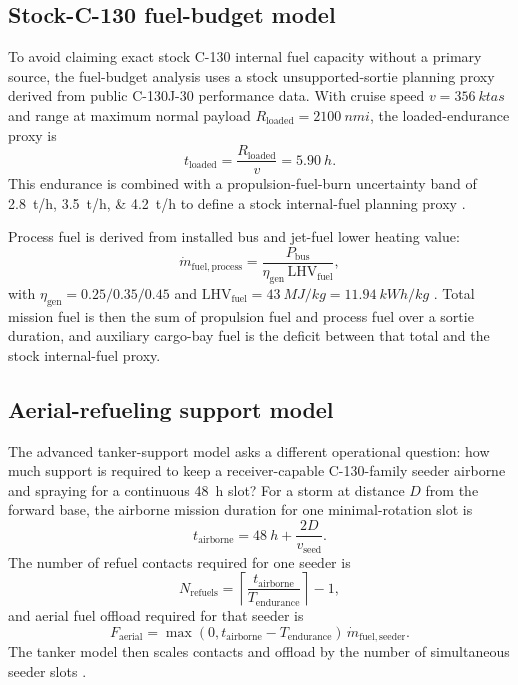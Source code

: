 \documentclass[8pt,twocolumn]{extarticle}
\begin{document}
\subsection*{Stock-C-130 fuel-budget model}

To avoid claiming exact stock C-130 internal fuel capacity without a primary source, the fuel-budget analysis uses a stock unsupported-sortie planning proxy derived from public C-130J-30 performance data. With cruise speed $v = \SI{356}{ktas}$ and range at maximum normal payload $R_{\mathrm{loaded}} = \SI{2100}{nmi}$, the loaded-endurance proxy is
\begin{equation}
t_{\mathrm{loaded}} = \frac{R_{\mathrm{loaded}}}{v} = \SI{5.90}{h} .
\end{equation}
This endurance is combined with a propulsion-fuel-burn uncertainty band of \SIlist{2.8;3.5;4.2}{t/h} to define a stock internal-fuel planning proxy \citep{AeolusFuelNote,LockheedC130J30}.

\vspace{0.25em}
Process fuel is derived from installed bus and jet-fuel lower heating value:
\begin{equation}
\dot{m}_{\mathrm{fuel,process}} = \frac{P_{\mathrm{bus}}}{\eta_{\mathrm{gen}} \,\mathrm{LHV}_{\mathrm{fuel}}} ,
\end{equation}
with $\eta_{\mathrm{gen}} = 0.25/0.35/0.45$ and $\mathrm{LHV}_{\mathrm{fuel}} = \SI{43}{MJ/kg} = \SI{11.94}{kWh/kg}$ \citep{AeolusFuelNote}. Total mission fuel is then the sum of propulsion fuel and process fuel over a sortie duration, and auxiliary cargo-bay fuel is the deficit between that total and the stock internal-fuel proxy.

\subsection*{Aerial-refueling support model}

The advanced tanker-support model asks a different operational question: how much support is required to keep a receiver-capable C-130-family seeder airborne and spraying for a continuous \SI{48}{h} slot? For a storm at distance $D$ from the forward base, the airborne mission duration for one minimal-rotation slot is
\begin{equation}
t_{\mathrm{airborne}} = \SI{48}{h} + \frac{2D}{v_{\mathrm{seed}}} .
\end{equation}
The number of refuel contacts required for one seeder is
\begin{equation}
N_{\mathrm{refuels}} = \left\lceil \frac{t_{\mathrm{airborne}}}{T_{\mathrm{endurance}}} \right\rceil - 1 ,
\end{equation}
and aerial fuel offload required for that seeder is
\begin{equation}
F_{\mathrm{aerial}} = \max(0, t_{\mathrm{airborne}} - T_{\mathrm{endurance}})\,\dot{m}_{\mathrm{fuel,seeder}} .
\end{equation}
The tanker model then scales contacts and offload by the number of simultaneous seeder slots \citep{AeolusPayloadMethods,AeolusSourceLog}.
\end{document}
